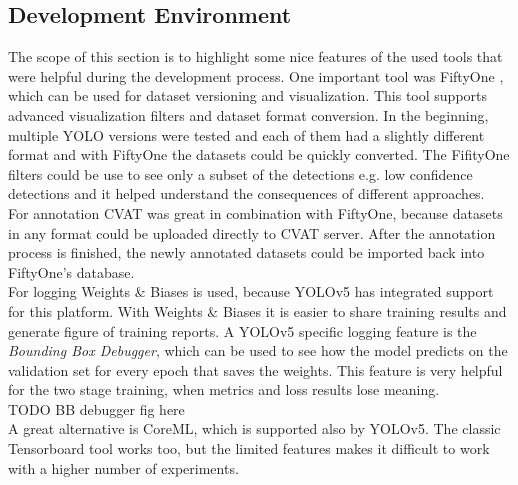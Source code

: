 \subsection{Development Environment}
The scope of this section is to highlight some nice features of the used tools that were helpful during the development process. One important tool was FiftyOne \cite{fiftyone_git}, which can be used for dataset versioning and visualization. This tool supports advanced visualization filters and dataset format conversion. In the beginning, multiple YOLO versions were tested and each of them had a slightly different format and with FiftyOne the datasets could be quickly converted. The FifityOne filters could be use to see only a subset of the detections e.g. low confidence detections and it helped understand the consequences of different approaches.  \\
For annotation CVAT was great in combination with FiftyOne, because datasets in any format could be uploaded directly to CVAT server. After the annotation process is finished, the newly annotated datasets could be imported back into FiftyOne's database. \\
For logging Weights \& Biases is used, because YOLOv5 has integrated support for this platform. With Weights \& Biases it is easier to share training results and generate figure of training reports. A YOLOv5 specific logging feature is the \textit{Bounding Box Debugger}, which can be used to see how the model predicts on the validation set for every epoch that saves the weights. This feature is very helpful for the two stage training, when metrics and loss results lose meaning. \\
TODO BB debugger fig here \\
A great alternative is CoreML, which is supported also by YOLOv5. The classic Tensorboard tool works too, but the limited features makes it difficult to work with a higher number of experiments. \\

